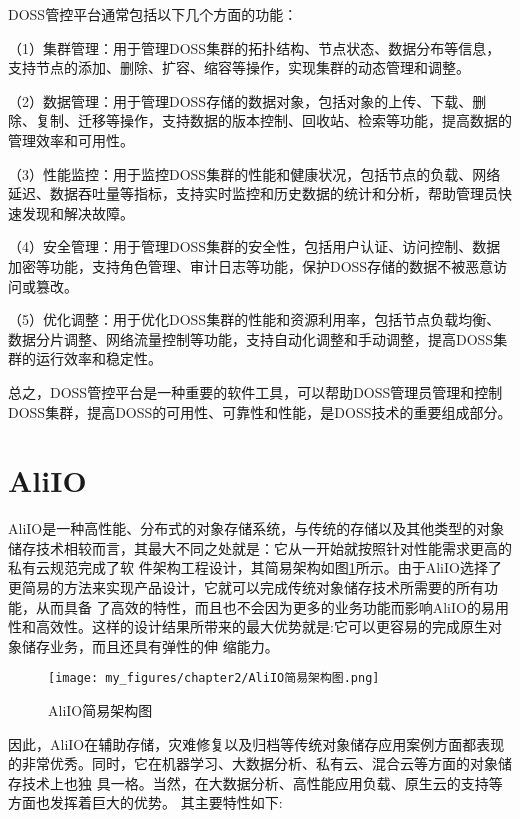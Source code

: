 DOSS管控平台通常包括以下几个方面的功能：

（1）集群管理：用于管理DOSS集群的拓扑结构、节点状态、数据分布等信息，支持节点的添加、删除、扩容、缩容等操作，实现集群的动态管理和调整。

（2）数据管理：用于管理DOSS存储的数据对象，包括对象的上传、下载、删除、复制、迁移等操作，支持数据的版本控制、回收站、检索等功能，提高数据的管理效率和可用性。

（3）性能监控：用于监控DOSS集群的性能和健康状况，包括节点的负载、网络延迟、数据吞吐量等指标，支持实时监控和历史数据的统计和分析，帮助管理员快速发现和解决故障。

（4）安全管理：用于管理DOSS集群的安全性，包括用户认证、访问控制、数据加密等功能，支持角色管理、审计日志等功能\cite{kongqii}，保护DOSS存储的数据不被恶意访问或篡改。

（5）优化调整：用于优化DOSS集群的性能和资源利用率，包括节点负载均衡、数据分片调整、网络流量控制等功能，支持自动化调整和手动调整，提高DOSS集群的运行效率和稳定性。

总之，DOSS管控平台是一种重要的软件工具，可以帮助DOSS管理员管理和控制DOSS集群，提高DOSS的可用性、可靠性和性能，是DOSS技术的重要组成部分。

\section{AliIO}

AliIO是一种高性能、分布式的对象存储系统，与传统的存储以及其他类型的对象储存技术相较而言，其最大不同之处就是：它从一开始就按照针对性能需求更高的私有云规范完成了软
件架构工程设计，其简易架构如图\ref{fig:/AliIO简易架构图}所示。由于AliIO选择了更简易的方法来实现产品设计，它就可以完成传统对象储存技术所需要的所有功能，从而具备
了高效的特性，而且也不会因为更多的业务功能而影响AliIO的易用性和高效性。这样的设计结果所带来的最大优势就是:它可以更容易的完成原生对象储存业务，而且还具有弹性的伸
缩能力。

\begin{figure}[h]
    \centering
    \texttt{[image: my\_figures/chapter2/AliIO简易架构图.png]}
    \caption{AliIO简易架构图}
    \label{fig:/AliIO简易架构图}
\end{figure}

因此，AliIO在辅助存储，灾难修复以及归档等传统对象储存应用案例方面都表现的非常优秀。同时，它在机器学习、大数据分析、私有云、混合云等方面的对象储存技术上也独
具一格。当然，在大数据分析、高性能应用负载、原生云的支持等方面也发挥着巨大的优势。
其主要特性如下:

